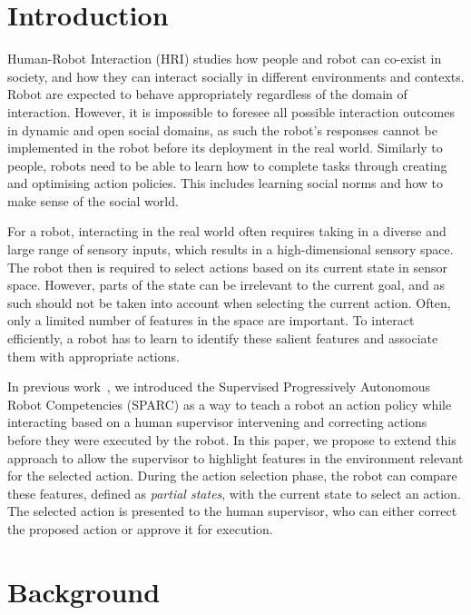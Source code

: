 \documentclass[letterpaper]{article} %
\begin{document}
\section{Introduction}

Human-Robot Interaction (HRI) studies how people and robot can co-exist in
 society, and how they can interact socially in different environments and
 contexts. Robot are expected to behave appropriately regardless of the domain
 of interaction. However, it is impossible to foresee all possible interaction
 outcomes in dynamic and open social domains, as such the robot's responses
 cannot be implemented in the robot before its deployment in the real world.
 Similarly to  people, robots need to be able to learn how to complete tasks
 through creating and optimising action policies. This includes learning social
 norms and how to make sense of the social world.

For a robot, interacting in the real world often requires taking in a diverse
 and large range of sensory inputs, which results in a high-dimensional sensory
 space. The robot then is required to select actions based on its current state
 in sensor space. However, parts of the state can be irrelevant to the current
 goal, and as such should not be taken into account when selecting the current
 action. Often, only a limited number of features in the space are important. To
 interact efficiently, a robot has to learn to identify these salient features
 and associate them with appropriate actions.

In previous work~\cite{senft2015sparc,senft2017supervised}, we introduced the
Supervised Progressively Autonomous Robot Competencies (SPARC) as a way to teach a
robot an action policy while interacting based on a human supervisor intervening
and correcting actions before they were executed by the robot. In this paper, we
propose to extend this approach to allow the supervisor to highlight features in
the environment relevant for the selected action. During the action selection
phase, the robot can compare these features, defined as \textit{partial states}, with the
current state to select an action. The selected action is presented to the human
supervisor, who can either correct the proposed action or approve it for execution.


\section{Background}
\end{document}
